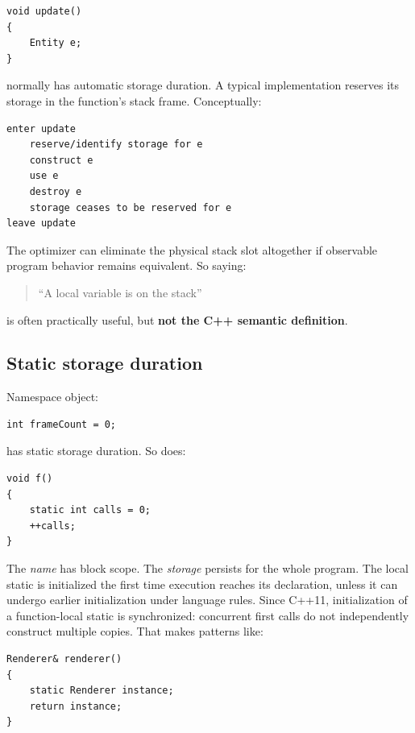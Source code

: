 \begin{verbatim}
void update()
{
    Entity e;
}
\end{verbatim}

 normally has automatic storage duration. A typical implementation reserves its storage in the function's stack frame. Conceptually:

\begin{verbatim}
enter update
    reserve/identify storage for e
    construct e
    use e
    destroy e
    storage ceases to be reserved for e
leave update
\end{verbatim}

The optimizer can eliminate the physical stack slot altogether if observable program behavior remains equivalent. So saying:

\begin{quote}
``A local variable is on the stack''
\end{quote}

is often practically useful, but \textbf{not the C++ semantic definition}.

\subsection{Static storage duration}\label{05-engine-i-ch002-static-storage-duration}

\hypertarget{05-engine-i-ch002-static-storage-duration}{}

Namespace object:

\begin{verbatim}
int frameCount = 0;
\end{verbatim}

has static storage duration. So does:

\begin{verbatim}
void f()
{
    static int calls = 0;
    ++calls;
}
\end{verbatim}

The \emph{name}  has block scope. The \emph{storage} persists for the whole program. The local static is initialized the first time execution reaches its declaration, unless it can undergo earlier initialization under language rules. Since C++11, initialization of a function-local static is synchronized: concurrent first calls do not independently construct multiple copies. That makes patterns like:

\begin{verbatim}
Renderer& renderer()
{
    static Renderer instance;
    return instance;
}
\end{verbatim}

